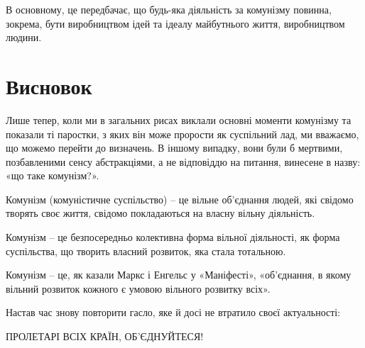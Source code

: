 \documentclass[12pt,a4paper,openany]{book}
\begin{document}
В основному, це передбачає, що будь-яка діяльність за комунізму повинна, зокрема, бути виробництвом ідей та ідеалу майбутнього життя, виробництвом людини.
\ifSubfilesClassLoaded{\setcounter{page}{62}}{}
\section{Висновок}
\label{sec:11_zaklyuchenie}

Лише тепер, коли ми в загальних рисах виклали основні моменти комунізму та показали ті паростки, з яких він може прорости як суспільний лад, ми вважаємо, що можемо перейти до визначень. В іншому випадку, вони були б мертвими, позбавленими сенсу абстракціями, а не відповіддю на питання, винесене в назву: «що таке комунізм?».

Комунізм (комуністичне суспільство) – це вільне об’єднання людей, які свідомо творять своє життя, свідомо покладаються на власну вільну діяльність.

Комунізм – це безпосередньо колективна форма вільної діяльності, як форма суспільства, що творить власний розвиток, яка стала тотальною.

Комунізм – це, як казали Маркс і Енгельс у «Маніфесті», «об’єднання, в якому вільний розвиток кожного є умовою вільного розвитку всіх».

Настав час знову повторити гасло, яке й досі не втратило своєї актуальності:

ПРОЛЕТАРІ ВСІХ КРАЇН, ОБ’ЄДНУЙТЕСЯ!
\end{document}
